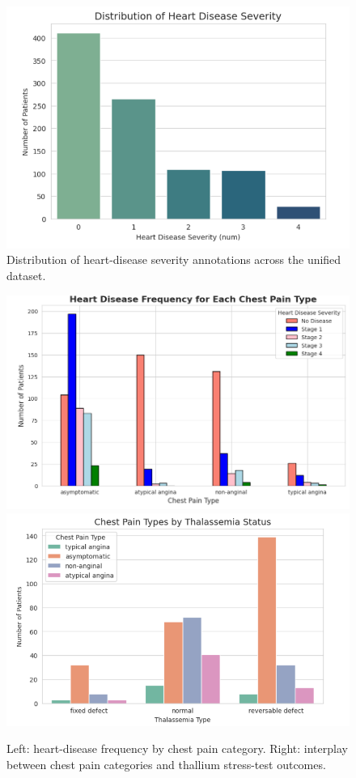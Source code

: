 \documentclass[12pt]{article}
\begin{document}
\begin{figure}[t]
  \centering
  \includegraphics[width=0.85\linewidth]{heart_disease_severity_distribution.png}
  \caption{Distribution of heart-disease severity annotations across the unified dataset.}
  \label{fig:severity_distribution}
\end{figure}

\begin{figure}[t]
  \centering
  \includegraphics[width=0.45\linewidth]{heart_disease_frequency_by_chest_pain_type.png}
  \hfill
  \includegraphics[width=0.45\linewidth]{chest_pain_categories_by_thallium_status.png}
  \caption{Left: heart-disease frequency by chest pain category. Right: interplay between chest pain categories and thallium stress-test outcomes.}
  \label{fig:cp_thallium}
\end{figure}
\end{document}
